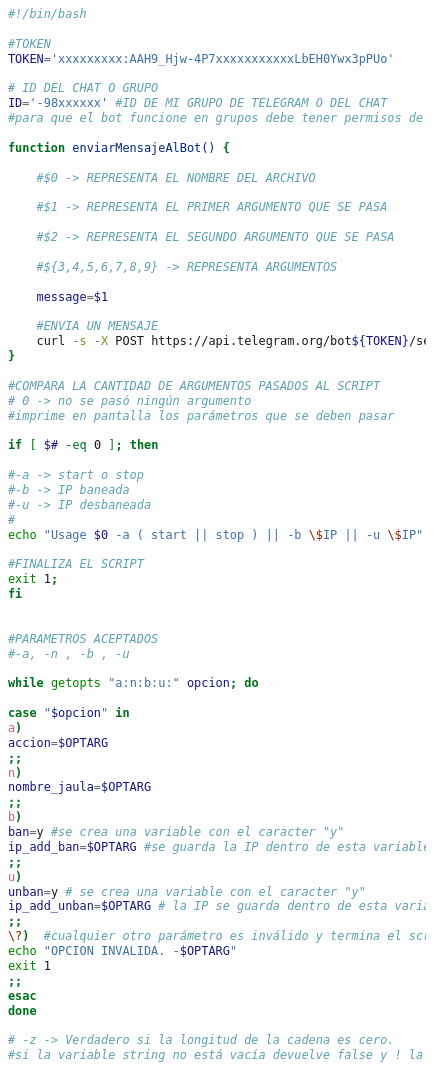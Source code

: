 		\begin{lstlisting}[language=Bash, caption=Script - send telegram notif]
			
			#!/bin/bash
			
			#TOKEN
			TOKEN='xxxxxxxxx:AAH9_Hjw-4P7xxxxxxxxxxxLbEH0Ywx3pPUo'
			
			# ID DEL CHAT O GRUPO
			ID='-98xxxxxx' #ID DE MI GRUPO DE TELEGRAM O DEL CHAT
			#para que el bot funcione en grupos debe tener permisos de administrador
			
			function enviarMensajeAlBot() {
				
				#$0 -> REPRESENTA EL NOMBRE DEL ARCHIVO
				
				#$1 -> REPRESENTA EL PRIMER ARGUMENTO QUE SE PASA
				
				#$2 -> REPRESENTA EL SEGUNDO ARGUMENTO QUE SE PASA
				
				#${3,4,5,6,7,8,9} -> REPRESENTA ARGUMENTOS
				
				message=$1
				
				#ENVIA UN MENSAJE 
				curl -s -X POST https://api.telegram.org/bot${TOKEN}/sendMessage -d text="${message}" -d chat_id=${ID} > /dev/null 2>&1
			}
			
			#COMPARA LA CANTIDAD DE ARGUMENTOS PASADOS AL SCRIPT
			# 0 -> no se pasó ningún argumento
			#imprime en pantalla los parámetros que se deben pasar
			
			if [ $# -eq 0 ]; then
			
			#-a -> start o stop
			#-b -> IP baneada
			#-u -> IP desbaneada
			#
			echo "Usage $0 -a ( start || stop ) || -b \$IP || -u \$IP"
			
			#FINALIZA EL SCRIPT
			exit 1;
			fi
			
			
			#PARAMETROS ACEPTADOS
			#-a, -n , -b , -u
			
			while getopts "a:n:b:u:" opcion; do
			
			case "$opcion" in
			a)
			accion=$OPTARG
			;;
			n)
			nombre_jaula=$OPTARG
			;;
			b)
			ban=y #se crea una variable con el caracter "y"
			ip_add_ban=$OPTARG #se guarda la IP dentro de esta variable
			;;
			u)
			unban=y # se crea una variable con el caracter "y"
			ip_add_unban=$OPTARG # la IP se guarda dentro de esta variable
			;;
			\?)  #cualquier otro parámetro es inválido y termina el script
			echo "OPCION INVALIDA. -$OPTARG" 
			exit 1
			;;
			esac
			done
			
			# -z -> Verdadero si la longitud de la cadena es cero.
			#si la variable string no está vacía devuelve false y ! la niega y cambia a true.
			

\end{lstlisting}
